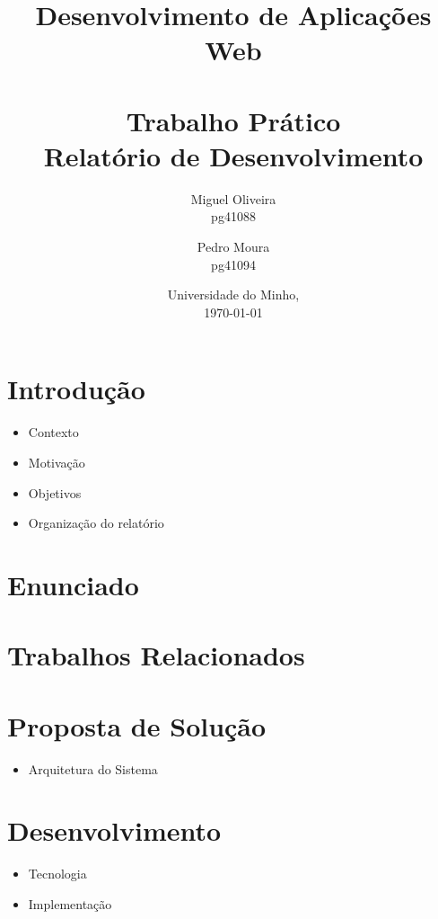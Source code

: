 \documentclass[11pt,a4paper]{report}
\begin{document}
\title{
    Desenvolvimento de Aplicações Web\\
    \textbf{\\Trabalho Prático}
    \large{\\Relatório de Desenvolvimento}
}

\author{
    Miguel Oliveira\\ pg41088
    \and Pedro Moura\\ pg41094
}
\date{Universidade do Minho,\\\today}

\maketitle


\tableofcontents


\chapter{Introdução}
\begin{itemize}
    \item Contexto
    \item Motivação
    \item Objetivos
    \item Organização do relatório
\end{itemize}


\chapter{Enunciado}


\chapter{Trabalhos Relacionados}


\chapter{Proposta de Solução}
\begin{itemize}
    \item Arquitetura do Sistema
\end{itemize}


\chapter{Desenvolvimento}
\begin{itemize}
    \item Tecnologia
    \item Implementação
\end{itemize}
\end{document}
